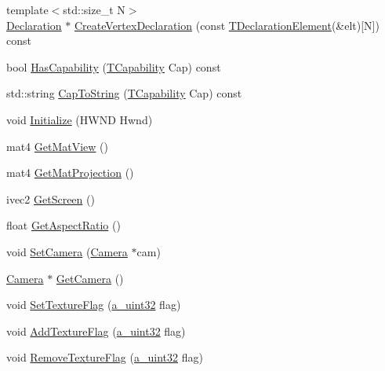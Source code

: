 \begin{DoxyCompactItemize}
\item 
{\footnotesize template$<$std\+::size\+\_\+t N$>$ }\\\hyperlink{class_agmd_1_1_declaration}{Declaration} $\ast$ \hyperlink{class_agmd_1_1_driver_a93266682368c862356b50269041f983f}{Create\+Vertex\+Declaration} (const \hyperlink{struct_agmd_1_1_t_declaration_element}{T\+Declaration\+Element}(\&elt)\mbox{[}N\mbox{]}) const 
\item 
bool \hyperlink{class_agmd_1_1_driver_ac97e6ae7ed4b0e1bfe6905c3ac2642d2}{Has\+Capability} (\hyperlink{namespace_agmd_ac521de717d36bdd8a4aa86150d82a038}{T\+Capability} Cap) const 
\item 
std\+::string \hyperlink{class_agmd_1_1_driver_a2a2572fd9014436acc31978a2f992f8e}{Cap\+To\+String} (\hyperlink{namespace_agmd_ac521de717d36bdd8a4aa86150d82a038}{T\+Capability} Cap) const 
\item 
void \hyperlink{class_agmd_1_1_driver_a59a990194eb3b481b0b76a1a4257981a}{Initialize} (H\+W\+N\+D Hwnd)
\item 
mat4 \hyperlink{class_agmd_1_1_driver_a62c2818bf3bd13156ccd8dba304e05c7}{Get\+Mat\+View} ()
\item 
mat4 \hyperlink{class_agmd_1_1_driver_a0725af382475485e57a9d043d4e16f96}{Get\+Mat\+Projection} ()
\item 
ivec2 \hyperlink{class_agmd_1_1_driver_a94ddb55c49236dc19039b0ff01b6c90e}{Get\+Screen} ()
\item 
float \hyperlink{class_agmd_1_1_driver_a5e2188067d439d7ee62926934a6f7ff5}{Get\+Aspect\+Ratio} ()
\item 
void \hyperlink{class_agmd_1_1_driver_a1eb6624a294fc7020491b097893cc413}{Set\+Camera} (\hyperlink{class_agmd_1_1_camera}{Camera} $\ast$cam)
\item 
\hyperlink{class_agmd_1_1_camera}{Camera} $\ast$ \hyperlink{class_agmd_1_1_driver_a6994b46ccadacdbadae526fc9cb6ea1b}{Get\+Camera} ()
\item 
void \hyperlink{class_agmd_1_1_driver_a77c765bf0e8a52d67fb3d5ab00a9513f}{Set\+Texture\+Flag} (\hyperlink{_common_defines_8h_a964296f9770051b9e4807b1f180dd416}{a\+\_\+uint32} flag)
\item 
void \hyperlink{class_agmd_1_1_driver_a819b761e20b3db3e3804983753ccf66d}{Add\+Texture\+Flag} (\hyperlink{_common_defines_8h_a964296f9770051b9e4807b1f180dd416}{a\+\_\+uint32} flag)
\item 
void \hyperlink{class_agmd_1_1_driver_a8d52a15414214f02e7e472f3fb5d6588}{Remove\+Texture\+Flag} (\hyperlink{_common_defines_8h_a964296f9770051b9e4807b1f180dd416}{a\+\_\+uint32} flag)

\end{DoxyCompactItemize}
